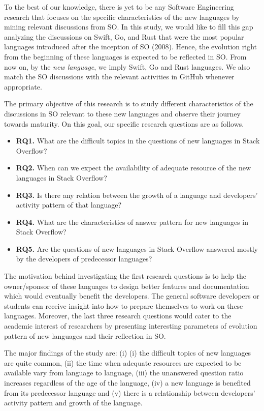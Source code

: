 To the best of our knowledge, there is yet to be any Software Engineering research that focuses on the specific characteristics of the new languages by mining relevant discussions from SO. In this study, we would like to fill this gap analyzing the discussions on Swift, Go, and Rust that were the most popular languages introduced after the inception of SO (2008). Hence, the evolution right from the beginning of these languages is expected to be reflected in SO. From now on, by the \emph{new language},  we imply Swift, Go and Rust languages. We also match the SO discussions with the relevant activities in GitHub whenever appropriate. 

The primary objective of this research is to study different characteristics of the discussions in SO relevant to these new languages and observe their journey towards maturity. On this goal, our specific research questions are as follows.
\begin{itemize}
\item \textbf{RQ1.} What are the difficult topics in the questions of new languages in Stack Overflow?
\item \textbf{RQ2.} When can we expect the availability of adequate resource of the new languages in Stack Overflow?
\item \textbf{RQ3.} Is there any relation between the growth of a language and developers' activity pattern of that language?
\item \textbf{RQ4.} What are the characteristics of answer pattern for new languages in Stack Overflow?
\item \textbf{RQ5.} Are the questions of new languages in Stack Overflow answered mostly by the developers of predecessor languages?
\end{itemize}

The motivation behind investigating the first research questions is to help the owner/sponsor of these languages to design better features and documentation which would eventually benefit the developers. The general software developers or students can receive insight into how to prepare themselves to work on these languages. Moreover, the last three research questions would cater to the academic interest of researchers by presenting interesting parameters of evolution pattern of new languages and their reflection in SO.


The major findings of the study are: (i) (i) the difficult topics of new languages are quite common, (ii) the time when adequate resources are expected to be available vary from language to language, (iii) the unanswered question ratio increases regardless of the age of the language, (iv) a new language is benefited from its predecessor language and (v) there is a relationship between developers' activity pattern and growth of the language.


